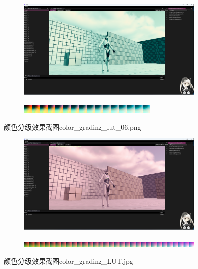 \documentclass{ctexart}
\begin{document}
    \begin{figure}[!htb]
        \centering
        \begin{subfigure}{1.0\textwidth}
            \includegraphics[width=\textwidth]{screen_shot_color_grading_map_color_grading_lut_06.png}
        \end{subfigure}
        \begin{subfigure}{1.0\textwidth}
            \includegraphics[width=\textwidth]{color_grading_lut_06.png}
        \end{subfigure}      
        \caption{颜色分级效果截图color\_grading\_lut\_06.png}
    \end{figure}
    \begin{figure}[!htb]
    	\centering
    	\begin{subfigure}{1.0\textwidth}
    		\includegraphics[width=\textwidth]{screen_shot_color_grading_LUT.png}
    	\end{subfigure}
    	\begin{subfigure}{1.0\textwidth}
    		\includegraphics[width=\textwidth]{color_grading_LUT.jpg}
    	\end{subfigure}      
    	\caption{颜色分级效果截图color\_grading\_LUT.jpg}
    \end{figure}   
    
\end{document}
